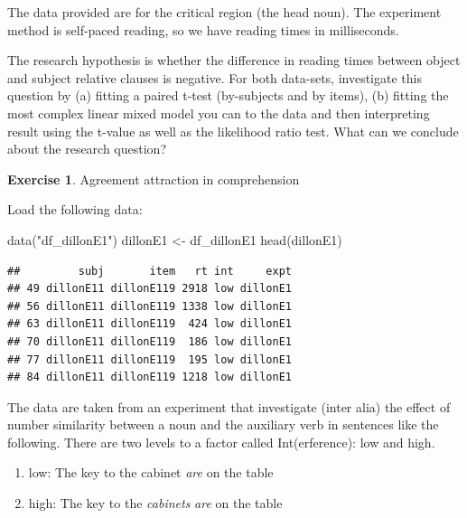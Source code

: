 \documentclass[
  12pt,
]{krantz}
\newenvironment{Shaded}{\begin{snugshade}}{\end{snugshade}}
\newcommand{\FunctionTok}[1]{\textcolor[rgb]{0.00,0.00,0.00}{#1}}
\newcommand{\NormalTok}[1]{#1}
\newcommand{\OtherTok}[1]{\textcolor[rgb]{0.56,0.35,0.01}{#1}}
\newcommand{\StringTok}[1]{\textcolor[rgb]{0.31,0.60,0.02}{#1}}
\providecommand{\tightlist}{%
  \setlength{\itemsep}{0pt}\setlength{\parskip}{0pt}}
\theoremstyle{definition}
\theoremstyle{definition}
\theoremstyle{definition}
\newtheorem{exercise}{Exercise}[chapter]
\theoremstyle{definition}
\theoremstyle{remark}
\begin{document}
The data provided are for the critical region (the head noun). The experiment method is self-paced reading, so we have reading times in milliseconds.

The research hypothesis is whether the difference in reading times between object and subject relative clauses is negative. For both data-sets, investigate this question by (a) fitting a paired t-test (by-subjects and by items), (b) fitting the most complex linear mixed model you can to the data and then interpreting result using the t-value as well as the likelihood ratio test. What can we conclude about the research question?

\begin{exercise}
\protect\hypertarget{exr:HypTestExerciseAgrmt}{}\label{exr:HypTestExerciseAgrmt}Agreement attraction in comprehension
\end{exercise}

Load the following data:

\begin{Shaded}
\begin{Highlighting}[]
\FunctionTok{data}\NormalTok{(}\StringTok{"df\_dillonE1"}\NormalTok{)}
\NormalTok{dillonE1 }\OtherTok{\textless{}{-}}\NormalTok{ df\_dillonE1}
\FunctionTok{head}\NormalTok{(dillonE1)}
\end{Highlighting}
\end{Shaded}

\begin{verbatim}
##         subj       item   rt int     expt
## 49 dillonE11 dillonE119 2918 low dillonE1
## 56 dillonE11 dillonE119 1338 low dillonE1
## 63 dillonE11 dillonE119  424 low dillonE1
## 70 dillonE11 dillonE119  186 low dillonE1
## 77 dillonE11 dillonE119  195 low dillonE1
## 84 dillonE11 dillonE119 1218 low dillonE1
\end{verbatim}

The data are taken from an experiment that investigate (inter alia) the effect of number similarity between a noun and the auxiliary verb in sentences like the following. There are two levels to a factor called Int(erference): low and high.

\begin{enumerate}
\def\labelenumi{(\alph{enumi})}
\tightlist
\item
  low: The key to the cabinet \emph{are} on the table
\item
  high: The key to the \emph{cabinets} \emph{are} on the table
\end{enumerate}
\end{document}
